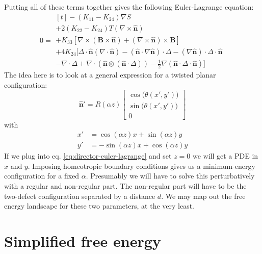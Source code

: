\documentclass[reqno]{article}
\newcommand{\n}{\hat{\mathbf{n}}}
\begin{document}
Putting all of these terms together gives the following Euler-Lagrange equation:
\begin{equation} \label{eq:director-euler-lagrange}
    0
    =
    \begin{multlined}[t]
    - \left(K_{11} - K_{24}\right) \nabla S \\
    + 2 \left(K_{22} - K_{24}\right) T \left(\nabla \times \n \right) \\
    + K_{33} \left[ 
        \nabla \times \left(\mathbf{B} \times \n \right)
        + \left( \nabla \times \n \right) \times \mathbf{B}
    \right] \\
    + 4 K_{24} \bigl[
        \Delta \cdot \n \left(\nabla \cdot \n\right)
        - \left( \n \cdot \nabla \n \right) \cdot \Delta
        - \left( \nabla \n \right) \cdot \Delta \cdot \n \\
        - \nabla \cdot \Delta
        + \nabla \cdot \left(\n \otimes \left(\n \cdot \Delta\right) \right)
        - \tfrac12 \nabla \left( \n \cdot \Delta \cdot \n \right)
    \bigr]
    \end{multlined}
\end{equation}
The idea here is to look at a general expression for a twisted planar configuration:
\begin{equation}
    \n'
    =
    R (\alpha z)
    \begin{bmatrix}
        \cos\bigl(\theta(x', y')\bigr) \\
        \sin\bigl(\theta(x', y')\bigr) \\
        0
    \end{bmatrix}
\end{equation}
with
\begin{equation}
\begin{split}
    x' 
    &= 
    \cos(\alpha z) x + \sin(\alpha z) y \\
    y'
    &=
    -\sin(\alpha z) x + \cos(\alpha z) y
\end{split}
\end{equation}
If we plug into eq. \eqref{eq:director-euler-lagrange} and set $z = 0$ we will get a PDE in $x$ and $y$.
Imposing homeotropic boundary conditions gives us a minimum-energy configuration for a fixed $\alpha$.
Presumably we will have to solve this perturbatively with a regular and non-regular part.
The non-regular part will have to be the two-defect configuration separated by a distance $d$.
We may map out the free energy landscape for these two parameters, at the very least. 

\section{Simplified free energy}
\end{document}
